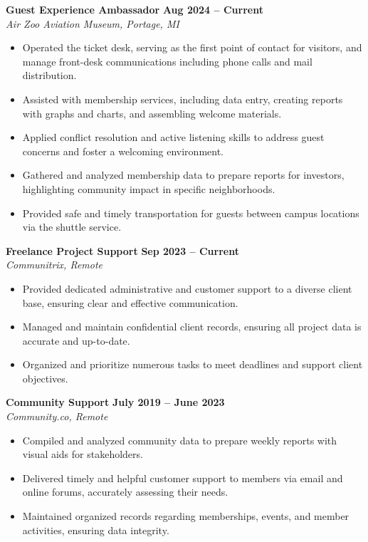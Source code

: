 \documentclass[a4paper,10pt]{article}
\begin{document}
\textbf{Guest Experience Ambassador} \hfill \textbf{Aug 2024 -- Current} \\
\textit{Air Zoo Aviation Museum, Portage, MI}
\begin{itemize}[leftmargin=*, nosep]
    \item Operated the ticket desk, serving as the first point of contact for visitors, and manage front-desk communications including phone calls and mail distribution.
    \item Assisted with membership services, including data entry, creating reports with graphs and charts, and assembling welcome materials.
    \item Applied conflict resolution and active listening skills to address guest concerns and foster a welcoming environment.
    \item Gathered and analyzed membership data to prepare reports for investors, highlighting community impact in specific neighborhoods.
    \item Provided safe and timely transportation for guests between campus locations via the shuttle service.
\end{itemize}
\vspace{0.5em}
\textbf{Freelance Project Support} \hfill \textbf{Sep 2023 -- Current} \\
\textit{Communitrix, Remote}
\begin{itemize}[leftmargin=*, nosep]
    \item Provided dedicated administrative and customer support to a diverse client base, ensuring clear and effective communication.
    \item Managed and maintain confidential client records, ensuring all project data is accurate and up-to-date.
    \item Organized and prioritize numerous tasks to meet deadlines and support client objectives.
\end{itemize}
\vspace{0.5em}
\textbf{Community Support} \hfill \textbf{July 2019 -- June 2023} \\
\textit{Community.co, Remote}
\begin{itemize}[leftmargin=*, nosep]
    \item Compiled and analyzed community data to prepare weekly reports with visual aids for stakeholders.
    \item Delivered timely and helpful customer support to members via email and online forums, accurately assessing their needs.
    \item Maintained organized records regarding memberships, events, and member activities, ensuring data integrity.
\end{itemize}
\end{document}

